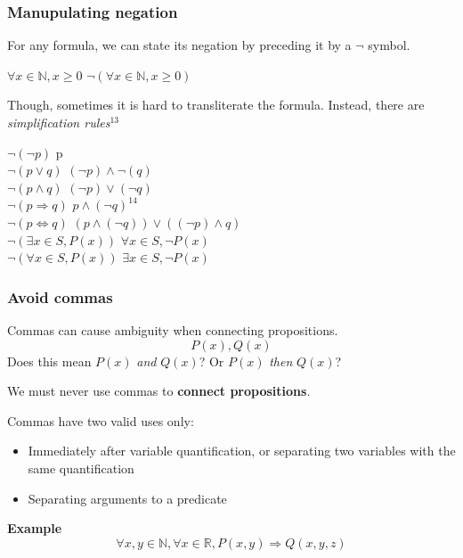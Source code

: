 \documentclass{article}
\begin{document}
\subsubsection*{Manupulating negation}
For any formula, we can state its negation by preceding it by a $\neg$ symbol.

$\forall x \in \mathbb{N}, x \geq 0$ \hfill  $\neg(\forall x \in \mathbb{N}, x \geq 0)$

Though, sometimes it is hard to transliterate the formula. Instead, there are 
\textit{simplification rules}$^{13}$

$\neg(\neg p)$ \hfill p \\
$\neg(p \lor q)$ \hfill $(\neg p) \land \neg(q)$ \\
$\neg(p \land q)$ \hfill $(\neg p) \lor (\neg q)$ \\
$\neg(p \Rightarrow q)$ \hfill $p \land (\neg q) ^{14}$ \\
$\neg(p \Leftrightarrow q)$ \hfill $(p \land (\neg q)) \lor ((\neg p)\land q)$ \\
$\neg(\exists x \in S, P(x))$ \hfill $\forall x \in S, \neg P(x)$ \\
$\neg(\forall x \in S, P(x))$ \hfill $\exists x \in S, \neg P(x)$ 


\subsubsection*{Avoid commas}
Commas can cause ambiguity when connecting propositions.
$$P(x), Q(x)$$
Does this mean $P(x)$ \textit{and} $Q(x)$? Or $P(x)$ \textit{then} $Q(x)$? 

We must never use commas to \textbf{connect propositions}.

Commas have two valid uses only:
\begin{itemize}
    \item Immediately after variable quantification, or separating two variables 
        with the same quantification
    \item Separating arguments to a predicate
\end{itemize}

\textbf{Example} 
$$\forall x, y \in \mathbb{N}, \forall x \in \mathbb{R}, P(x, y) \Rightarrow Q(x, y, z)$$
\end{document}

